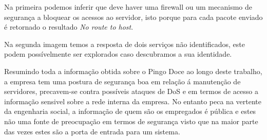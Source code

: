 \par Na primeira podemos inferir que deve haver uma firewall ou um mecanismo de segurança a bloquear os acessos ao servidor, isto porque para cada pacote enviado é retornado o resultado \textit{No route to host}.\newline
\par Na segunda imagem temos a resposta de dois serviços não identificados, este podem possívelmente ser explorados caso descubramos a sua identidade.\newline
\par Resumindo toda a informação obtida sobre o Pingo Doce ao longo deste trabalho, a empresa tem uma postura de segurança boa em relação á manutenção de servidores, precavem-se contra possíveis ataques de DoS e em termos de acesso a informação sensivel sobre a rede interna da empresa. No entanto peca na vertente da engenharia social, a informação de quem são os empregados é pública e estes não uma fonte de preocupação em termos de segurança visto que na maior parte das vezes estes são a porta de entrada para um sistema. 


